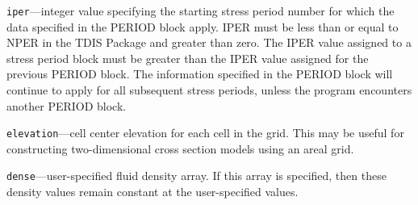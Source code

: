 \begin{description}
\item \texttt{iper}---integer value specifying the starting stress period number for which the data specified in the PERIOD block apply.  IPER must be less than or equal to NPER in the TDIS Package and greater than zero.  The IPER value assigned to a stress period block must be greater than the IPER value assigned for the previous PERIOD block.  The information specified in the PERIOD block will continue to apply for all subsequent stress periods, unless the program encounters another PERIOD block.

\item \texttt{elevation}---cell center elevation for each cell in the grid.  This may be useful for constructing two-dimensional cross section models using an areal grid.

\item \texttt{dense}---user-specified fluid density array.  If this array is specified, then these density values remain constant at the user-specified values.

\end{description}

